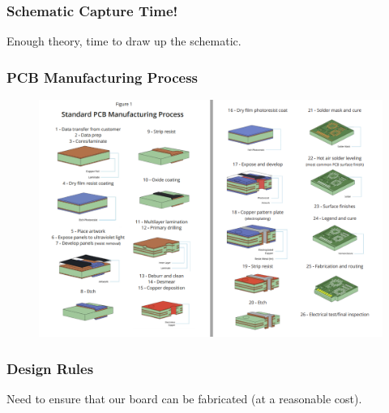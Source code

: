 \documentclass[t]{beamer}
\begin{document}

\begin{frame}
\frametitle{Schematic Capture Time!}
Enough theory, time to draw up the schematic.
\end{frame}



\begin{frame}
\frametitle{PCB Manufacturing Process}

\begin{figure}
	\includegraphics[width = 0.9\linewidth]{pcbManufacture.png}
\end{figure}

\end{frame}


\begin{frame}
\frametitle{Design Rules}
Need to ensure that our board can be fabricated (at a reasonable cost).
\end{frame}

\end{document}
